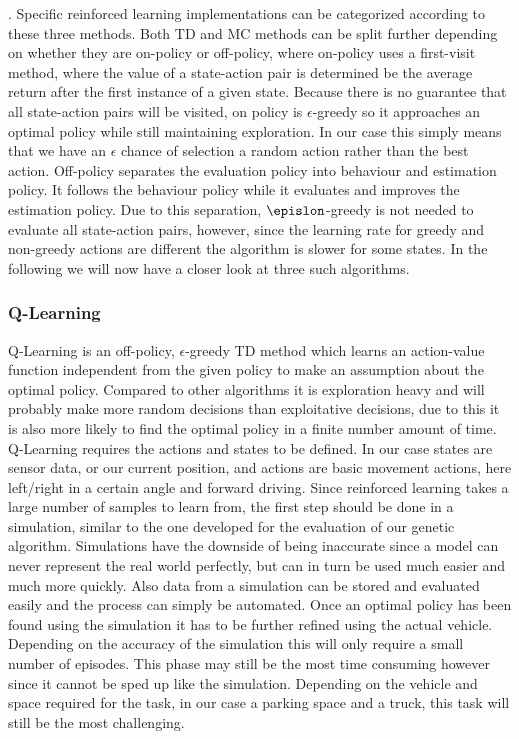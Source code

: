 \cite{9}. Specific reinforced learning implementations can be categorized according to these three methods. Both TD and MC methods can be split further depending on whether they are on-policy or off-policy, where on-policy uses a first-visit method, where the value of a state-action pair is determined be the average return after the first instance of a given state. Because there is no guarantee that all state-action pairs will be visited, on policy is $\epsilon$-greedy so it approaches an optimal policy while still maintaining exploration. In our case this simply means that we have an $\epsilon$ chance of selection a random action rather than the best action. Off-policy separates the evaluation policy into behaviour and estimation policy. It follows the behaviour policy while it evaluates and improves the estimation policy. Due to this separation, $\epislon$-greedy is not needed to evaluate all state-action pairs, however, since the learning rate for greedy and non-greedy actions are different the algorithm is slower for some states. 
In the following we will now have a closer look at three such algorithms.

\subsubsection{Q-Learning}
\label{sec:q-learning}

Q-Learning is an off-policy, $\epsilon$-greedy TD method which learns an action-value function independent from the given policy to make an assumption about the optimal policy. Compared to other algorithms it is exploration heavy and will probably make more random decisions than exploitative decisions, due to this it is also more likely to find the optimal policy in a finite number amount of time. Q-Learning requires the actions and states to be defined. In our case states are sensor data, or our current position, and actions are basic movement actions, here left/right in a certain angle and forward driving. Since reinforced learning takes a large number of samples to learn from, the first step should be done in a simulation, similar to the one developed for the evaluation of our genetic algorithm. Simulations have the downside of being inaccurate since a model can never represent the real world perfectly, but can in turn be used much easier and much more quickly. Also data from a simulation can be stored and evaluated easily and the process can simply be automated. Once an optimal policy has been found using the simulation it has to be further refined using the actual vehicle. Depending on the accuracy of the simulation this will only require a small number of episodes. This phase may still be the most time consuming however since it cannot be sped up like the simulation. Depending on the vehicle and space required for the task, in our case a parking space and a truck, this task will still be the most challenging.


